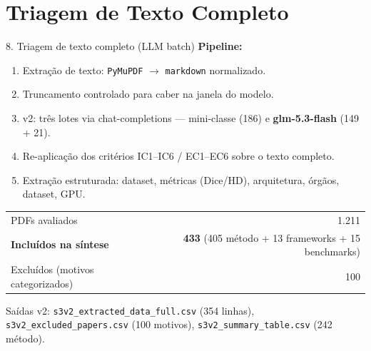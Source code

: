 \documentclass[aspectratio=169]{beamer}
\begin{document}
\section{Triagem de Texto Completo}
\begin{frame}{8. Triagem de texto completo (LLM batch)}
\small
\textbf{Pipeline:}
\begin{enumerate}
	\item Extração de texto: \texttt{PyMuPDF} $\to$ \texttt{markdown} normalizado.
	\item Truncamento controlado para caber na janela do modelo.
	\item v2: três lotes via chat-completions --- mini-classe (186) e \textbf{glm-5.3-flash} (149 + 21).
	\item Re-aplicação dos critérios IC1--IC6 / EC1--EC6 sobre o texto completo.
	\item Extração estruturada: dataset, métricas (Dice/HD), arquitetura, órgãos, dataset, GPU.
\end{enumerate}

\begin{table}
\centering
\begin{tabular}{lr}
\toprule
PDFs avaliados & 1.211 \\
\textbf{Incluídos na síntese} & \textbf{433} (405 método + 13 frameworks + 15 benchmarks) \\
Excluídos (motivos categorizados) & 100 \\
\bottomrule
\end{tabular}
\end{table}

\footnotesize Saídas v2: \texttt{s3v2\_extracted\_data\_full.csv} (354 linhas), \texttt{s3v2\_excluded\_papers.csv} (100 motivos), \texttt{s3v2\_summary\_table.csv} (242 método).
\end{frame}

\end{document}
